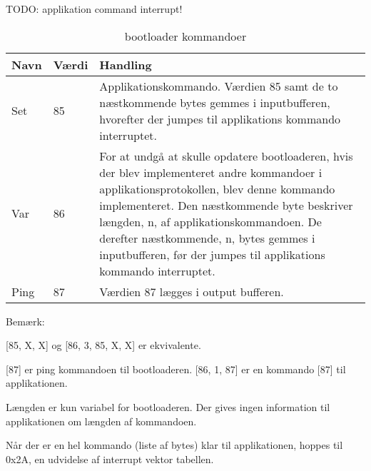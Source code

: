 TODO: applikation command interrupt!

\begin{table}
	\caption{bootloader kommandoer}
	\label{tab:blcommand}
	\centering

	\begin{tabular}{|l|l|p{13cm}|}
		\hline
		\textbf{Navn} & \textbf{Værdi} & \textbf{Handling} \\
		\hline
		Set & 85 & Applikationskommando. Værdien 85 samt de to næstkommende bytes gemmes i inputbufferen, hvorefter der jumpes til applikations kommando interruptet.\\
		\hline
		Var & 86 & For at undgå at skulle opdatere bootloaderen, hvis der blev implementeret andre kommandoer i applikationsprotokollen, blev denne kommando implementeret. Den næstkommende byte beskriver længden, n, af applikationskommandoen. De derefter næstkommende, n, bytes gemmes i inputbufferen, før der jumpes til applikations kommando interruptet.\\
		\hline
		Ping & 87 & Værdien 87 lægges i output bufferen.\\
		\hline
	\end{tabular}
\end{table}


\begin{mdquote}
	Bemærk:

	[85, X, X] og [86, 3, 85, X, X] er ekvivalente.

	[87] er ping kommandoen til bootloaderen. [86, 1, 87] er en kommando [87] til applikationen.
\end{mdquote}



Længden er kun variabel for bootloaderen. Der gives ingen information til applikationen om længden af kommandoen.

Når der er en hel kommando (liste af bytes) klar til applikationen, hoppes til 0x2A, en udvidelse af interrupt vektor tabellen.
